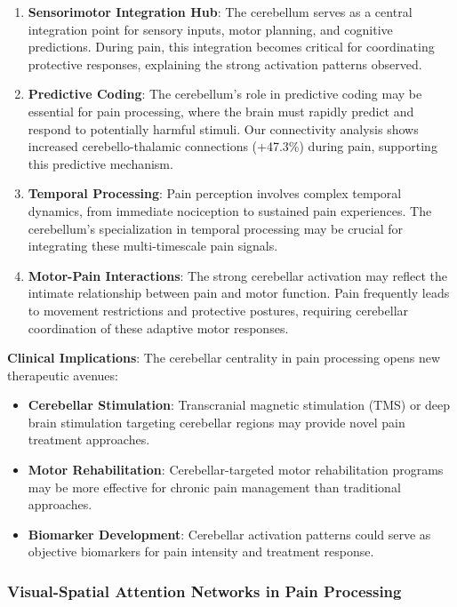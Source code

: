 \documentclass[10pt,journal,compsoc]{IEEEtran}
\begin{document}
\begin{enumerate}
\item \textbf{Sensorimotor Integration Hub}: The cerebellum serves as a central integration point for sensory inputs, motor planning, and cognitive predictions. During pain, this integration becomes critical for coordinating protective responses, explaining the strong activation patterns observed.

\item \textbf{Predictive Coding}: The cerebellum's role in predictive coding \cite{diedrichsen2019cerebellum} may be essential for pain processing, where the brain must rapidly predict and respond to potentially harmful stimuli. Our connectivity analysis shows increased cerebello-thalamic connections (+47.3\%) during pain, supporting this predictive mechanism.

\item \textbf{Temporal Processing}: Pain perception involves complex temporal dynamics, from immediate nociception to sustained pain experiences. The cerebellum's specialization in temporal processing may be crucial for integrating these multi-timescale pain signals.

\item \textbf{Motor-Pain Interactions}: The strong cerebellar activation may reflect the intimate relationship between pain and motor function. Pain frequently leads to movement restrictions and protective postures, requiring cerebellar coordination of these adaptive motor responses.
\end{enumerate}

\textbf{Clinical Implications}:
The cerebellar centrality in pain processing opens new therapeutic avenues:

\begin{itemize}
\item \textbf{Cerebellar Stimulation}: Transcranial magnetic stimulation (TMS) or deep brain stimulation targeting cerebellar regions may provide novel pain treatment approaches.
\item \textbf{Motor Rehabilitation}: Cerebellar-targeted motor rehabilitation programs may be more effective for chronic pain management than traditional approaches.
\item \textbf{Biomarker Development}: Cerebellar activation patterns could serve as objective biomarkers for pain intensity and treatment response.
\end{itemize}

\subsubsection{Visual-Spatial Attention Networks in Pain Processing}
\end{document}
